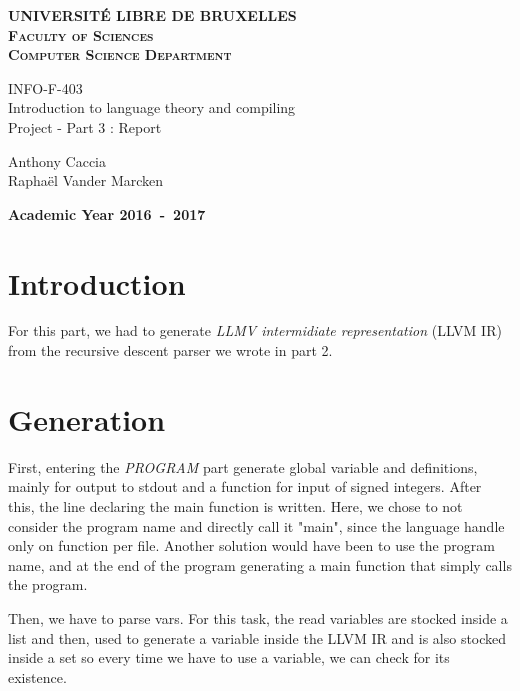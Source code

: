 \documentclass{article}
\newcommand{\hmwkClass}{INFO-F-403} %
\begin{document}
\begin{titlepage}
\begin{center}
\textbf{\textsc{UNIVERSIT\'E LIBRE DE BRUXELLES}}\\
\textbf{\textsc{Faculty of Sciences}}\\
\textbf{\textsc{Computer Science Department}}
\vfill{}
\begin{center}{\Huge \hmwkClass\\ \LARGE Introduction to language theory and compiling\\Project - Part 3 : Report}\end{center}{\Huge \par}
\begin{center}{\Large Anthony Caccia\\Raphaël Vander Marcken}\end{center}{\Huge \par}
\vfill{}
\vfill{}
\textbf{Academic Year 2016~-~2017}
\end{center}
\end{titlepage}

\section{Introduction}
For this part, we had to generate \emph{LLMV intermidiate representation} (LLVM IR) from the recursive descent parser we wrote in part 2.

\section{Generation}

First, entering the \emph{PROGRAM} part generate global variable and definitions, mainly for output to stdout and a function for input of signed integers. After this, the line declaring the main function is written. Here, we chose to not consider the program name and directly call it "main", since the language handle only on function per file. Another solution would have been to use the program name, and at the end of the program generating a main function that simply calls the program.

Then, we have to parse vars. For this task, the read variables are stocked inside a list and then, used to generate a variable inside the LLVM IR and is also stocked inside a set so every time we have to use a variable, we can check for its existence.
\end{document}
